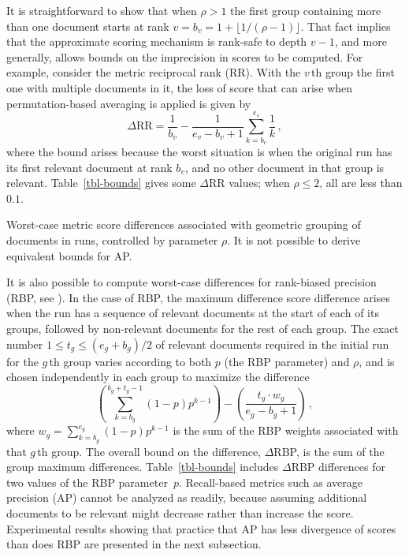
It is straightforward to show that when $\rho>1$ the first group
containing more than one document starts at rank
$v=b_v=1+\lfloor{1/(\rho-1)}\rfloor$.
That fact implies that the approximate scoring mechanism is rank-safe
to depth $v-1$, and more generally, allows bounds on the imprecision
in scores to be computed.
For example, consider the metric reciprocal rank (RR).
With the $v$\,th group the first one with multiple documents in it,
the loss of score that can arise when permutation-based averaging is
applied is given by
\[
	\Delta\mbox{RR} = \frac{1}{b_v} -
		\frac{1}{e_v-b_v+1}\sum_{k=b_v}^{e_v} \frac{1}{k} \,,
\]
where the bound arises because the worst situation is when the
original run has its first relevant document at rank $b_v$, and no
other document in that group is relevant.
Table~\ref{tbl-bounds} gives some $\Delta$RR values; when $\rho\le2$,
all are less than $0.1$.


\begin{table}[t]
\centering

\caption{Worst-case metric score differences associated with geometric
grouping of documents in runs, controlled by parameter $\rho$.
It is not possible to derive equivalent bounds for AP.
\label{tbl-bounds}}
\end{table}

It is also possible to compute worst-case differences for rank-biased
precision (RBP, see {\citet{mz08acmtois}}).
In the case of RBP, the maximum difference score difference arises
when the run has a sequence of relevant documents at the start of
each of its groups, followed by non-relevant documents for the rest
of each group.
The exact number $1\le t_g \le (e_g+b_g)/2$ of relevant documents
required in the initial run for the $g$\,th group varies according to
both $p$ (the RBP parameter) and $\rho$, and is chosen independently
in each group to maximize the difference
\[
	\left(
	\sum_{k=b_g}^{b_g+t_g-1} (1-p)p^{k-1}
	\right)
	-
	\left(
	\frac{t_g\cdot w_g}{e_g-b_g+1}
	\right) \, ,
\]
where $w_g=\sum_{k=b_g}^{e_g} (1-p)p^{k-1}$ is the sum of the RBP
weights associated with that $g$\,th group.
The overall bound on the difference, $\Delta$RBP, is the sum of the
group maximum differences.
Table~\ref{tbl-bounds} includes $\Delta$RBP differences for two
values of the RBP parameter~$p$.
Recall-based metrics such as average precision (AP) cannot be
analyzed as readily, because assuming additional documents to be
relevant might decrease rather than increase the score.
Experimental results showing that practice that AP has less
divergence of scores than does RBP are presented in the next
subsection.


